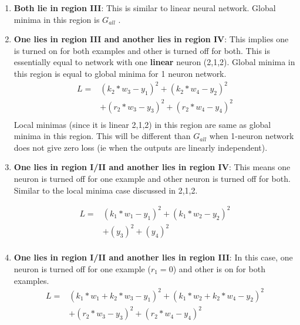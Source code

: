 \documentclass[conference]{IEEEtran}
\begin{document}
\begin{enumerate}
	\item \textbf{Both lie in region III}: This is similar to linear neural network. Global minima in this region is $G_{all}$ .
	\item \textbf{One lies in region III and another lies in region IV}: This implies one is turned on for both examples and other is turned off for both. This is essentially equal to network with one \textbf{linear} neuron (2,1,2). Global minima in this region is equal to global minima for 1 neuron network. 
	\begin{align*}
	L = &(k_2 * w_3 - y_1)^2 + (k_2 * w_4 - y_2)^2\\  
	&+ (r_2*w_3 - y_3)^2 + (r_2*w_4 - y_4)^2\\ 
	\end{align*}
	Local minimas (since it is linear 2,1,2) in this region are same as global minima in this region. This will be different than $G_{all}$ when 1-neuron network does not give zero loss (ie when the outputs are linearly independent).
	
	\item \textbf{One lies in region I/II and another lies in region IV}: This means one neuron is turned off for one example and other neuron is turned off for both. Similar to the local minima case discussed in 2,1,2.
	
	\begin{align*}
	L = &(k_1 * w_1- y_1)^2 + (k_1 * w_2 - y_2)^2\\  
	&+ (y_3)^2 + (y_4)^2\\
	\end{align*}
	
	\item \textbf{One lies in region I/II and another lies in region III}: In this case, one neuron is turned off for one example ($r_1 = 0$) and other is on for both examples.
	\begin{align*}
		L = &(k_1 * w_1 + k_2 * w_3 - y_1)^2 + (k_1 * w_2 + k_2 * w_4 - y_2)^2\\  
		&+ (r_2*w_3 - y_3)^2 + (r_2*w_4 - y_4)^2\\
	\end{align*}
	

\end{enumerate}
\end{document}
